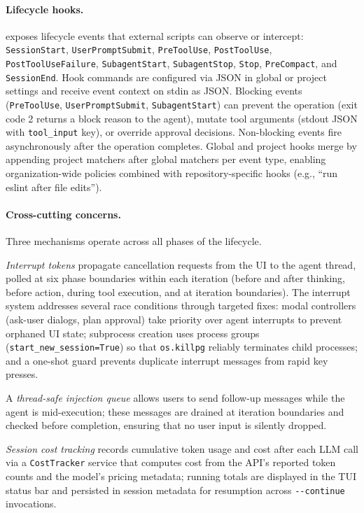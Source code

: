 \paragraph{Lifecycle hooks.} \name exposes lifecycle events that external scripts can observe or intercept: \texttt{SessionStart}, \texttt{UserPromptSubmit}, \texttt{PreToolUse}, \texttt{PostToolUse}, \texttt{PostToolUseFailure}, \texttt{SubagentStart}, \texttt{SubagentStop}, \texttt{Stop}, \texttt{PreCompact}, and \texttt{SessionEnd}. Hook commands are configured via JSON in global or project settings and receive event context on stdin as JSON. Blocking events (\texttt{PreToolUse}, \texttt{UserPromptSubmit}, \texttt{SubagentStart}) can prevent the operation (exit code 2 returns a block reason to the agent), mutate tool arguments (stdout JSON with \texttt{tool\_input} key), or override approval decisions. Non-blocking events fire asynchronously after the operation completes. Global and project hooks merge by appending project matchers after global matchers per event type, enabling organization-wide policies combined with repository-specific hooks (e.g., ``run eslint after file edits'').

\paragraph{Cross-cutting concerns.} Three mechanisms operate across all phases of the lifecycle.

\emph{Interrupt tokens} propagate cancellation requests from the UI to the agent thread, polled at six phase boundaries within each iteration (before and after thinking, before action, during tool execution, and at iteration boundaries). The interrupt system addresses several race conditions through targeted fixes: modal controllers (ask-user dialogs, plan approval) take priority over agent interrupts to prevent orphaned UI state; subprocess creation uses process groups (\texttt{start\_new\_session=True}) so that \texttt{os.killpg} reliably terminates child processes; and a one-shot guard prevents duplicate interrupt messages from rapid key presses.

A \emph{thread-safe injection queue} allows users to send follow-up messages while the agent is mid-execution; these messages are drained at iteration boundaries and checked before completion, ensuring that no user input is silently dropped.

\emph{Session cost tracking} records cumulative token usage and cost after each LLM call via a \texttt{CostTracker} service that computes cost from the API's reported token counts and the model's pricing metadata; running totals are displayed in the TUI status bar and persisted in session metadata for resumption across \texttt{-{}-continue} invocations.

